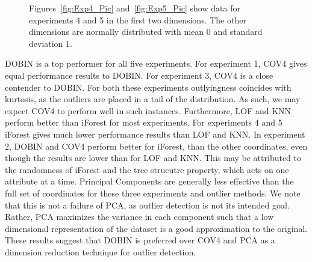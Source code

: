 \documentclass[letter,12pt]{article}
\begin{document}
\begin{figure}
   \centering
 	\caption{Figures~\ref{fig:Exp4_Pic} and~\ref{fig:Exp5_Pic} show data for experiments 4 and 5 in the first two dimensions. The other dimensions are normally distributed with mean $0$ and standard deviation $1$.  }
\end{figure}
{\color{blue} DOBIN is a top performer for all five experiments. For experiment 1, COV4 gives equal performance results to DOBIN. For experiment 3,  COV4 is a close contender to DOBIN. For both these experiments outlyingness coincides with kurtosis, as the outliers are placed in a tail of the distribution. As such, we may expect COV4 to perform well in such instances.  Furthermore, LOF and KNN perform better than iForest for most experiments. For experiments 4 and 5 iForest gives much lower performance results than LOF and KNN. In experiment 2, DOBIN and COV4 perform better for iForest, than the other coordinates, even though the results are lower than for LOF and KNN. This may be attributed to the randomness of iForest and the tree strucutre property, which acts on one attribute at a time. }
Principal Components are generally less effective than the full set of coordinates for these three experiments and outlier methods. We note that this is not a failure of PCA, as outlier detection is not its intended goal. Rather, PCA maximizes the variance in each component such that a low dimensional representation of the dataset is a good approximation to the original. These results suggest that DOBIN is preferred over COV4 and PCA as a dimension reduction technique for outlier detection. %
\end{document}
